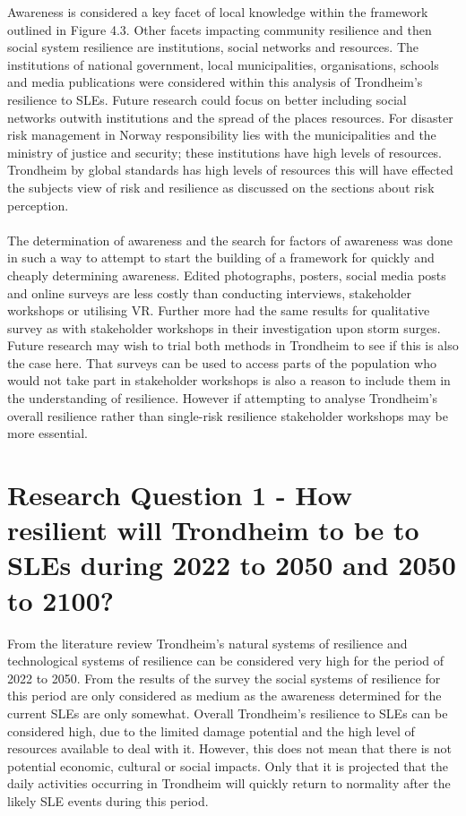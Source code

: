 Awareness is considered a key facet of local knowledge within the framework outlined in Figure 4.3. Other facets impacting community resilience and then social system resilience are institutions, social networks and resources. The institutions of national government, local municipalities, organisations, schools and media publications were considered within this analysis of Trondheim's resilience to SLEs. Future research could focus on better including social networks outwith institutions and the spread of the places resources. For disaster risk management in Norway responsibility lies with the municipalities and the ministry of justice and security; these institutions have high levels of resources. Trondheim by global standards has high levels of resources this will have effected the subjects view of risk and resilience as discussed on the sections about risk perception. 
\paragraph{}
The determination of awareness and the search for factors of awareness was done in such a way to attempt to start the building of a framework for quickly and cheaply determining awareness. Edited photographs, posters, social media posts and online surveys are less costly than conducting interviews, stakeholder workshops or utilising VR. Further more \cite{gerkensmeier_governing_2018} had the same results for qualitative survey as with stakeholder workshops in their investigation upon storm surges. Future research may wish to trial both methods in Trondheim to see if this is also the case here. That surveys can be used to access parts of the population who would not take part in stakeholder workshops is also a reason to include them in the understanding of resilience. However if attempting to analyse Trondheim's overall resilience rather than single-risk resilience stakeholder workshops may be more essential.


\section{Research Question 1 - How resilient will Trondheim to be to SLEs during 2022 to 2050 and 2050 to 2100? }
From the literature review Trondheim's natural systems of resilience and technological systems of resilience can be considered very high for the period of 2022 to 2050. From the results of the survey the  social systems of resilience for this period are only considered as medium as the awareness determined for the current SLEs are only somewhat. Overall Trondheim's resilience to SLEs can be considered high, due to the limited damage potential and the high level of resources available to deal with it. However, this does not mean that there is not potential economic, cultural or social impacts. Only that it is projected that the daily activities occurring in Trondheim will quickly return to normality after the likely SLE events during this period.
